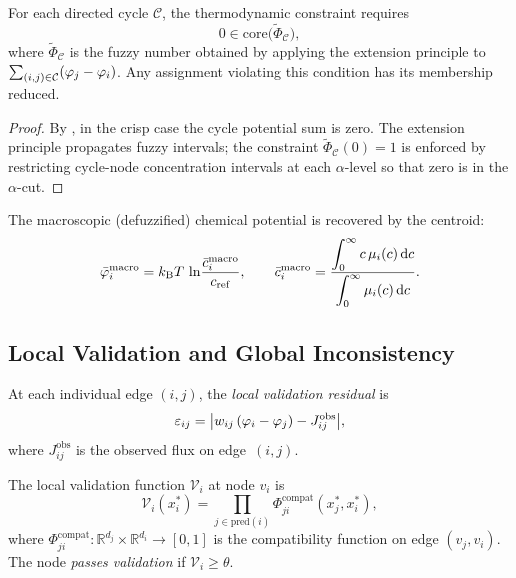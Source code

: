 \begin{theorem}
\label{thm:fuzzy-kvl}
For each directed cycle $\mathcal{C}$, the thermodynamic constraint
requires
\begin{equation}
  0 \in \mathrm{core}\!\bigl(\widetilde{\Phi}_{\mathcal{C}}\bigr),
  \label{eq:fuzzy-kvl}
\end{equation}
where $\widetilde{\Phi}_{\mathcal{C}}$ is the fuzzy number obtained by
applying the extension principle to $\sum_{(i,j)\in\mathcal{C}} (\varphi_j - \varphi_i)$.
Any assignment violating this condition has its membership reduced.
\end{theorem}

\begin{proof}
By , in the crisp case the cycle potential sum is
zero.  The extension principle propagates fuzzy intervals; the constraint
$\widetilde{\Phi}_{\mathcal{C}}(0) = 1$ is enforced by restricting
cycle-node concentration intervals at each $\alpha$-level so that zero
is in the $\alpha$-cut.
\end{proof}

The macroscopic (defuzzified) chemical potential is recovered by the
centroid:
\begin{equation}
  \bar{\varphi}_i^{\mathrm{macro}}
  = k_{\mathrm{B}} T\,\ln\!\frac{\bar{c}_i^{\mathrm{macro}}}{c_{\mathrm{ref}}},
  \qquad
  \bar{c}_i^{\mathrm{macro}}
  = \frac{\displaystyle\int_0^\infty c\,\mu_i(c)\,\mathrm{d}c}
         {\displaystyle\int_0^\infty \mu_i(c)\,\mathrm{d}c}.
  \label{eq:defuzz}
\end{equation}

\subsection{Local Validation and Global Inconsistency}

At each individual edge $(i,j)$, the \emph{local validation residual} is
\begin{equation}
  \varepsilon_{ij}
  = \bigl|w_{ij}\,(\varphi_i - \varphi_j) - J_{ij}^{\mathrm{obs}}\bigr|,
  \label{eq:local-validation}
\end{equation}
where $J_{ij}^{\mathrm{obs}}$ is the observed flux on edge~$(i,j)$.

\begin{definition}
\label{def:local-validation}
The local validation function $\mathcal{V}_i$ at node $v_i$ is
\begin{equation}
  \mathcal{V}_i(x_i^{*})
  = \prod_{j \in \mathrm{pred}(i)}
    \Phi_{ji}^{\mathrm{compat}}(x_j^{*}, x_i^{*}),
  \label{eq:validation}
\end{equation}
where $\Phi_{ji}^{\mathrm{compat}} : \mathbb{R}^{d_j} \times \mathbb{R}^{d_i} \to [0,1]$
is the compatibility function on edge $(v_j, v_i)$.  The node
\emph{passes validation} if $\mathcal{V}_i \geq \theta$.
\end{definition}

